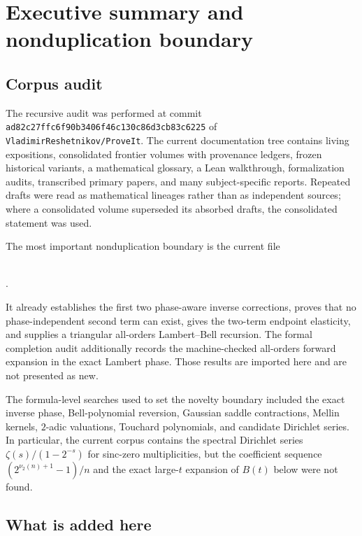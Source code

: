 \documentclass[11pt,oneside]{article}
\numberwithin{equation}{section}
\theoremstyle{definition}
\theoremstyle{remark}
\newcommand{\vTwo}{\nu_2}
\begin{document}
\tableofcontents
\clearpage

\section{Executive summary and nonduplication boundary}
\label{sec:executive}

\subsection{Corpus audit}

The recursive audit was performed at commit
\texttt{ad82c27ffc6f90b3406f46c130c86d3cb83c6225} of
\texttt{VladimirReshetnikov/ProveIt}.  The current documentation tree contains
living expositions, consolidated frontier volumes with provenance ledgers,
frozen historical variants, a mathematical glossary, a Lean walkthrough,
formalization audits, transcribed primary papers, and many subject-specific
reports.  Repeated drafts were read as mathematical lineages rather than as
independent sources; where a consolidated volume superseded its absorbed
drafts, the consolidated statement was used.

The most important nonduplication boundary is the current file
\begin{center}
\small
{}\\[-0.3em]
.
\end{center}
It already establishes the first two phase-aware inverse corrections, proves
that no phase-independent second term can exist, gives the two-term endpoint
elasticity, and supplies a triangular all-orders Lambert--Bell recursion.  The
formal completion audit additionally records the machine-checked all-orders
forward expansion in the exact Lambert phase.  Those results are imported
here and are not presented as new.

The formula-level searches used to set the novelty boundary included the exact
inverse phase, Bell-polynomial reversion, Gaussian saddle contractions,
Mellin kernels, $2$-adic valuations, Touchard polynomials, and candidate
Dirichlet series.  In particular, the current corpus contains the spectral
Dirichlet series $\zeta(s)/(1-2^{-s})$ for sinc-zero multiplicities, but the
coefficient sequence
\(
(2^{\vTwo(n)+1}-1)/n
\)
and the exact large-$t$ expansion of $B(t)$ below were not found.

\subsection{What is added here}
\end{document}
